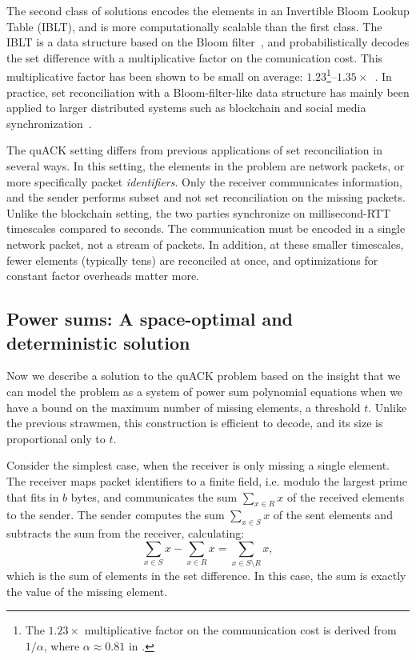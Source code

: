 The second class of solutions encodes the elements in an Invertible Bloom Lookup
Table (IBLT), and is more computationally scalable than the first class. The
IBLT is a data structure based on the Bloom filter~\cite{goodrich2011invertible},
and probabilistically decodes the set difference with a multiplicative factor
on the comunication cost. This multiplicative factor has been shown to be small
on average: $1.23$\footnote{The $1.23\times$ multiplicative factor on the
communication cost is derived from $1/\alpha$, where $\alpha \approx 0.81$ in
\cite{baek2023simple}.}--$1.35\times$~\cite{yang2024practical,baek2023simple}.
In practice, set reconciliation with a Bloom-filter-like data structure has
mainly been applied to larger distributed systems such as blockchain and social
media synchronization~\cite{yang2024practical,summermatter2021byzantine}.

The quACK setting differs from previous applications of set reconciliation in
several ways. In this setting, the elements in the problem are network packets,
or more specifically packet \textit{identifiers}. Only the receiver
communicates information, and the sender performs subset and not set
reconciliation on the missing packets. Unlike the blockchain setting, the two
parties synchronize on millisecond-RTT timescales compared to seconds. The
communication must be encoded in a single network packet, not a stream of
packets. In addition, at these smaller timescales, fewer elements
(typically tens) are reconciled at once, and optimizations for constant factor
overheads matter more.

\subsection{Power sums: A space-optimal and deterministic solution}
\label{sec:quack:constructions:power-sum}

Now we describe a solution to the quACK problem based on the insight
that we can model the problem as a system of power sum polynomial equations
when we have a bound on the maximum number of missing elements, a threshold $t$.
Unlike the previous strawmen, this construction is efficient to decode, and
its size is proportional only to $t$.

Consider the simplest case, when the receiver is only missing a single element.
The receiver maps packet identifiers to a finite field,
i.e. modulo the largest prime that fits in $b$ bytes,
 and communicates the sum $\sum_{x \in R} x$ of the received
elements to
the sender. The sender computes the sum $\sum_{x \in S} x$ of the sent elements
and subtracts the sum from the receiver, calculating:
\[
    \sum_{x \in S} x - \sum_{x \in R} x = \sum_{x \in S\setminus R} x,
\]
which is the sum of elements in the set difference. In this case, the sum is
exactly the value of the missing element.

